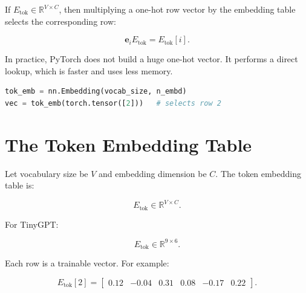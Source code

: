 \begin{center}
\end{center}

If \(E_{\text{tok}}\in\mathbb{R}^{V\times C}\), then multiplying a one-hot row vector by the embedding table selects the corresponding row:

\[
\mathbf{e}_i E_{\text{tok}} = E_{\text{tok}}[i].
\]

In practice, PyTorch does not build a huge one-hot vector. It performs a direct lookup, which is faster and uses less memory.

\begin{lstlisting}[language=Python]
tok_emb = nn.Embedding(vocab_size, n_embd)
vec = tok_emb(torch.tensor([2]))   # selects row 2
\end{lstlisting}

\section{The Token Embedding Table}

Let vocabulary size be \(V\) and embedding dimension be \(C\). The token embedding table is:

\[
E_{\text{tok}} \in \mathbb{R}^{V \times C}.
\]

For TinyGPT:

\[
E_{\text{tok}} \in \mathbb{R}^{9 \times 6}.
\]

Each row is a trainable vector. For example:

\[
E_{\text{tok}}[2] =
\begin{bmatrix}
0.12&-0.04&0.31&0.08&-0.17&0.22
\end{bmatrix}.
\]


